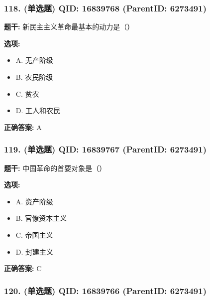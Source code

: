 \documentclass[12pt,UTF8]{ctexart}
\begin{document}
\subsubsection*{118. (单选题) \small QID: 16839768 (ParentID: 6273491)}

\textbf{题干:}
新民主主义革命最基本的动力是（）



\textbf{选项:}
\begin{itemize}[leftmargin=*]

  \item A. 无产阶级

  \item B. 农民阶级

  \item C. 贫农

  \item D. 工人和农民

\end{itemize}

\textbf{正确答案:}
A

\vspace{0.3em}\hrulefill\vspace{0.7em}

\subsubsection*{119. (单选题) \small QID: 16839767 (ParentID: 6273491)}

\textbf{题干:}
中国革命的首要对象是（）



\textbf{选项:}
\begin{itemize}[leftmargin=*]

  \item A. 资产阶级

  \item B. 官僚资本主义

  \item C. 帝国主义

  \item D. 封建主义

\end{itemize}

\textbf{正确答案:}
C

\vspace{0.3em}\hrulefill\vspace{0.7em}

\subsubsection*{120. (单选题) \small QID: 16839766 (ParentID: 6273491)}
\end{document}
